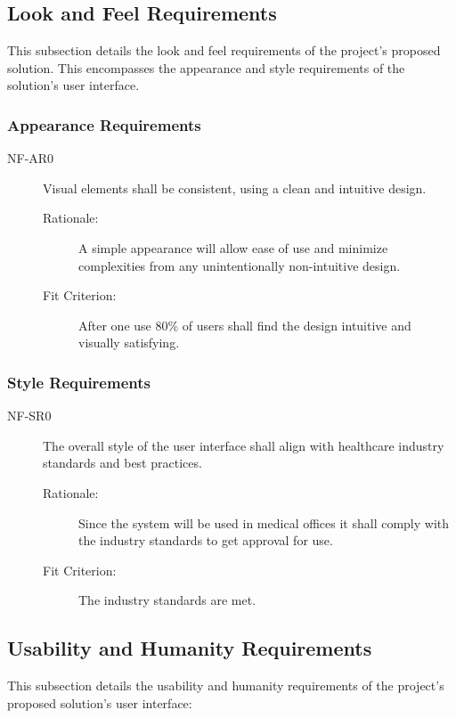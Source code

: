 \documentclass[12pt]{article}
\begin{document}
\subsection{Look and Feel Requirements}
This subsection details the look and feel requirements of the project's proposed solution.
This encompasses the appearance and style requirements of the solution's user interface.

\subsubsection{Appearance Requirements}
\begin{description}
    \item[NF-AR0] Visual elements shall be consistent, using a clean and intuitive design.
    \begin{description}
        \item[Rationale:] A simple appearance will allow ease of use and minimize complexities from any unintentionally non-intuitive design.
        \item[Fit Criterion:] After one use 80\% of users shall find the design intuitive and visually satisfying.
    \end{description}
\end{description}

\subsubsection{Style Requirements}
\begin{description}
    \item[NF-SR0] The overall style of the user interface shall align with healthcare industry standards and best practices. 
    \begin{description}
        \item[Rationale:] Since the system will be used in medical offices it shall comply with the industry standards to get approval for use.
        \item[Fit Criterion:] The industry standards are met.
    \end{description}
\end{description}

\subsection{Usability and Humanity Requirements}
This subsection details the usability and humanity requirements of the project's proposed solution's user interface:
\end{document}

